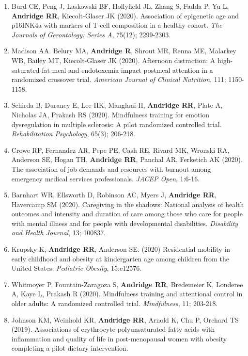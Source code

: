 \documentclass[
  english,
  letterpaper,
  DIV=11,
  numbers=noendperiod]{scrartcl}
\begin{document}
\begin{enumerate}
  \emph{Psychoneuroendocrinology}, 118; 104717.
\item
  Burd CE, Peng J, Laskowski BF, Hollyfield JL, Zhang S, Fadda P, Yu L,
  \textbf{Andridge RR}, Kiecolt-Glaser JK (2020). Association of
  epigenetic age and p16INK4a with markers of T-cell composition in a
  healthy cohort. \emph{The Journals of Gerontology: Series A}, 75(12);
  2299-2303.
\item
  Madison AA. Belury MA, \textbf{Andridge R}, Shrout MR, Renna ME,
  Malarkey WB, Bailey MT, Kiecolt-Glaser JK (2020). Afternoon
  distraction: A high-saturated-fat meal and endotoxemia impact postmeal
  attention in a randomized crossover trial. \emph{American Journal of
  Clinical Nutrition}, 111; 1150-1158.
\item
  Schirda B, Duraney E, Lee HK, Manglani H, \textbf{Andridge RR}, Plate
  A, Nicholas JA, Prakash RS (2020). Mindfulness training for emotion
  dysregulation in multiple sclerosis: A pilot randomized controlled
  trial. \emph{Rehabilitation Psychology}, 65(3); 206-218.
\item
  Crowe RP, Fernandez AR, Pepe PE, Cash RE, Rivard MK, Wronski RA,
  Anderson SE, Hogan TH, \textbf{Andridge RR}, Panchal AR, Ferketich AK
  (2020). The association of job demands and resources with burnout
  among emergency medical services professionals. \emph{JACEP Open},
  1:6-16.
\item
  Barnhart WR, Ellsworth D, Robinson AC, Myers J, \textbf{Andridge RR},
  Havercamp SM (2020). Caregiving in the shadows: National analysis of
  health outcomes and intensity and duration of care among those who
  care for people with mental illness and for people with developmental
  disabilities. \emph{Disability and Health Journal}, 13; 100837.
\item
  Krupsky K, \textbf{Andridge RR}, Anderson SE. (2020) Residential
  mobility in early childhood and obesity at kindergarten age among
  children from the United States. \emph{Pediatric Obesity}, 15:e12576.
\item
  Whitmoyer P, Fountain-Zaragoza S, \textbf{Andridge RR}, Bredemeier K,
  Londeree A, Kaye L, Prakash R (2020). Mindfulness training and
  attentional control in older adults: A randomized controlled trial.
  \emph{Mindfulness}, 11; 203-218.
\item
  Johnson KM, Weinhold KR, \textbf{Andridge RR}, Arnold K, Chu P,
  Orchard TS (2019). Associations of erythrocyte polyunsaturated fatty
  acids with inflammation and quality of life in post-menopausal women
  with obesity completing a pilot dietary intervention.

\end{enumerate}
\end{document}
